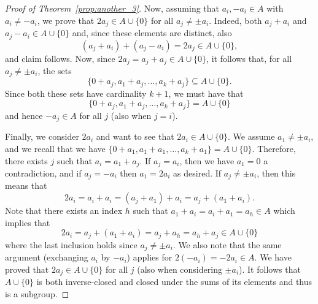 \documentclass[10pt,a4paper]{amsart}
\begin{document}
\begin{proof}[Proof of Theorem~\ref{prop:another_3}]
Now, assuming that $a_i,-a_i\in A$ with $a_i\neq -a_i$, we prove that $2a_j\in A\cup \{0\}$ for all $a_j\not=\pm a_i$. Indeed, both $a_j+a_i$ and $a_j-a_i\in A\cup \{0\}$ and, since these elements are distinct, also
$$(a_j+a_i)+(a_j-a_i)=2a_j\in A\cup \{0\},$$
and claim follows.
Now, since $2a_j=a_j+a_j\in A\cup \{0\}$, it follows that, for all $a_j\not=\pm a_i$, the sets 
$$\{0+a_j,a_1+a_j,\dots,a_k+a_j\}\subseteq A\cup \{0\}.$$
Since both these sets have cardinality $k+1$, we must have that 
$$\{0+a_j,a_1+a_j,\dots,a_k+a_j\}= A\cup \{0\}$$
and hence $-a_j\in A$ for all $j$ (also when $j=i$).

Finally, we consider $2a_i$ and want to see that $2a_i\in A\cup \{0\}$. We assume $a_1\not=\pm a_i$, and we recall that we have 
$\{0+a_1,a_1+a_1,\dots,a_k+a_1\}= A\cup \{0\}$.
Therefore, there exists $j$ such that $a_i=a_1+a_j$. 
If $a_j= a_i$, then we have $a_1=0$ a contradiction, and if $a_j= -a_i$ then $a_1=2a_i$ as desired. If $a_j\not=\pm a_i$, then 
this means that
$$2a_i=a_i+a_i=(a_j+a_1)+a_i=a_j+(a_1+a_i).$$
Note that there exists an index $h$ such that $a_1+a_i=a_i+a_1=a_h\in A$ which implies that 
$$2a_i=a_j+(a_1+a_i)=a_j+a_h=a_h+a_j \in A\cup \{0\}$$
where the last inclusion holds since $a_j\not=\pm a_i$. We also note that the same argument (exchanging $a_i$ by $-a_i$) applies for $2(-a_i)=-2a_i\in A$.
We have proved that
$2a_j\in A\cup\{0\}$ for all $j$ (also when considering $\pm a_i$). It follows that $A\cup \{0\}$ is both inverse-closed and closed under the sums of its elements and thus is a subgroup.
 \end{proof}
\end{document}
